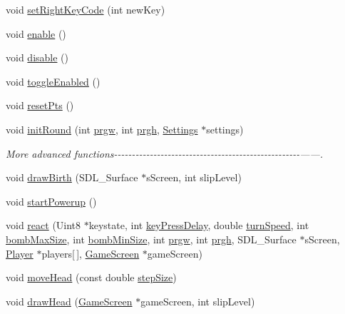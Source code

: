 \begin{DoxyCompactItemize}
void \hyperlink{classPlayer_a5a681cb2c03072ca1123ee63db0aabde}{set\+Right\+Key\+Code} (int new\+Key)
\item 
void \hyperlink{classPlayer_af60439bb211d1da858bfdc68e120e0fd}{enable} ()
\item 
void \hyperlink{classPlayer_a9d99cb573b2a2d06239510c2b941f2d8}{disable} ()
\item 
void \hyperlink{classPlayer_af32c1b07379d1b70fd4d2d654d3fedfe}{toggle\+Enabled} ()
\item 
void \hyperlink{classPlayer_aadae68cb1bb79e44da79b3dbdf54ae2c}{reset\+Pts} ()
\item 
void \hyperlink{classPlayer_a39939c5afd7a185f502c552279bdd445}{init\+Round} (int \hyperlink{main_8cpp_ad1e84142b0bcc502ca72ba239e8b7712}{prgw}, int \hyperlink{main_8cpp_a16fb66a2b03f119d60e570f8bf24570e}{prgh}, \hyperlink{classSettings}{Settings} $\ast$settings)
\begin{DoxyCompactList}\small\item\em More advanced functions-\/-\/-\/-\/-\/-\/-\/-\/-\/-\/-\/-\/-\/-\/-\/-\/-\/-\/-\/-\/-\/-\/-\/-\/-\/-\/-\/-\/-\/-\/-\/-\/-\/-\/-\/-\/-\/-\/-\/-\/-\/-\/-\/-\/-\/-\/-\/-\/-\/-\/-\/-\/------. \end{DoxyCompactList}\item 
void \hyperlink{classPlayer_aa68b9fe408e885a8806de7881b102ad6}{draw\+Birth} (S\+D\+L\+\_\+\+Surface $\ast$s\+Screen, int slip\+Level)
\item 
void \hyperlink{classPlayer_ada7a1aa4cb80f4ef0579165ee2f40462}{start\+Powerup} ()
\item 
void \hyperlink{classPlayer_a6ee577d800e047232c03050b673cc668}{react} (Uint8 $\ast$keystate, int \hyperlink{main_8cpp_a7af15b9cdc41ca984f18113cdea6b134}{key\+Press\+Delay}, double \hyperlink{main_8cpp_a481daf4312d87ec4697e82227394536c}{turn\+Speed}, int \hyperlink{main_8cpp_affaabf8fc47a7dd9262d94ed15876bea}{bomb\+Max\+Size}, int \hyperlink{main_8cpp_a977983348b076a15b137a0f4c8340312}{bomb\+Min\+Size}, int \hyperlink{main_8cpp_ad1e84142b0bcc502ca72ba239e8b7712}{prgw}, int \hyperlink{main_8cpp_a16fb66a2b03f119d60e570f8bf24570e}{prgh}, S\+D\+L\+\_\+\+Surface $\ast$s\+Screen, \hyperlink{classPlayer}{Player} $\ast$players\mbox{[}$\,$\mbox{]}, \hyperlink{classGameScreen}{Game\+Screen} $\ast$game\+Screen)
\item 
void \hyperlink{classPlayer_aa19e0519d995ace83f63802c8b6c2a49}{move\+Head} (const double \hyperlink{main_8cpp_a707dc5532cee7444ea37a95fdf2bd851}{step\+Size})
\item 
void \hyperlink{classPlayer_a01835b58ecee2d4509184f7e06c608f8}{draw\+Head} (\hyperlink{classGameScreen}{Game\+Screen} $\ast$game\+Screen, int slip\+Level)

\end{DoxyCompactItemize}

